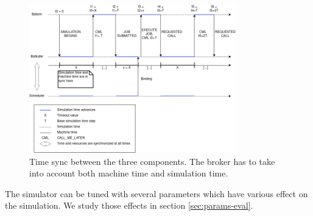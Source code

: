 \begin{figure}[]
	\centering
	\includegraphics[width=0.8\textwidth]{imgs/lignes_de_temps.png}
	\caption{Time sync between the three components. The broker has to take
	into account both machine time and simulation time.}
	\label{fig:time_sync}
\end{figure}

The simulator can be tuned with several parameters which have various effect on
the simulation. We study those effects in section \ref{sec:params-eval}.

